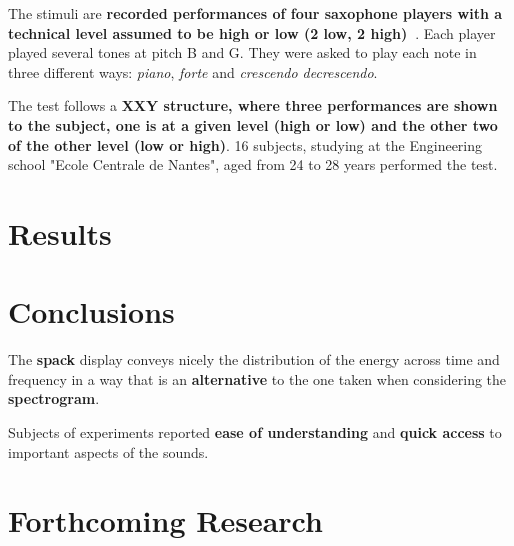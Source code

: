 \documentclass[a0,portrait,15pt]{a0poster}
\begin{document}
\begin{multicols}{2}
The stimuli are \textbf{recorded performances of four saxophone players with a technical level assumed to be high or low (2 low, 2 high)~\cite{robine2006evaluation}}. Each player played several tones at pitch B and G. They were asked to play each note in three different ways: \textit{piano}, \textit{forte} and \textit{crescendo decrescendo}.

The test follows a \textbf{XXY structure, where three performances are shown to the subject, one is at a given level (high or low) and the other two of the other level (low or high)}. 16 subjects, studying at the Engineering school "Ecole Centrale de Nantes", aged from 24 to 28 years performed the test.

\section*{Results}

\begin{center}
\end{center}


\color{SaddleBrown} %

\section*{Conclusions}

The \textbf{spack} display conveys nicely the distribution of the energy across time and frequency in a way that is an \textbf{alternative} to the one taken when considering the \textbf{spectrogram}.

Subjects of experiments reported \textbf{ease of understanding} and \textbf{quick access} to important aspects of the sounds.

\color{DarkSlateGray} %


\section*{Forthcoming Research}


\end{multicols}
\end{document}
